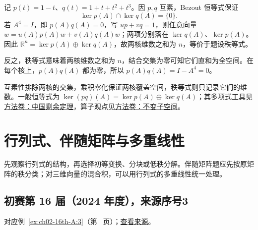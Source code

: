 \documentclass[12pt,fontset=fandol]{ctexart}
\begin{document}
\begin{solve}

记 $p(t)=1-t$、$q(t)=1+t+t^2+t^3$。因 $p,q$ 互素，Bezout 恒等式保证
\[
\ker p(A)\cap\ker q(A)=\{0\}.
\]
若 $A^4=I$，即 $p(A)q(A)=0$，写 $up+vq=1$，则任意向量 $w=u(A)p(A)w+v(A)q(A)w$；两项分别落在 $\ker q(A)$、$\ker p(A)$。因此
$\mathbb R^n=\ker p(A)\oplus\ker q(A)$，故两核维数之和为 $n$，等价于题设秩等式。

反之，秩等式意味着两核维数之和为 $n$，结合交集为零可知它们直和为全空间。在每个核上，$p(A)q(A)$ 都为零，所以 $p(A)q(A)=I-A^4=0$。

\end{solve}

\begin{remark}[方法与条件]

互素性排除两核的交集，乘积零化保证两核覆盖空间，秩等式则只记录它们的维数。一般恒等式为 $\ker(pq)(A)=\ker p(A)\oplus\ker q(A)$；其多项式工具见\hyperref[app:algebra-crt]{方法卷：中国剩余定理}，算子观点见\hyperref[app:linear-invariant]{方法卷：不变子空间}。

\end{remark}

\section{行列式、伴随矩阵与多重线性}

\label{sec:solutions-2}

先观察行列式的结构，再选择初等变换、分块或低秩分解。伴随矩阵题应先按原矩阵的秩分类；对三维向量的混合积，可以用行列式的多重线性统一处理。

\subsection{初赛第 16 届（2024 年度），来源序号3}\label{ans:ch02-16th-A:3}\label{pr:ch02-16th-A:3}

对应例~\ref{ex:ch02-16th-A:3}（第~\pageref{ex:ch02-16th-A:3} 页）；\href{https://github.com/lzxcr/cmc-mathematics/blob/64916fa1fdbc3e444a652eca204d5669058ee321/src/problems/preliminary/16/03.md}{查看来源}。
\end{document}
